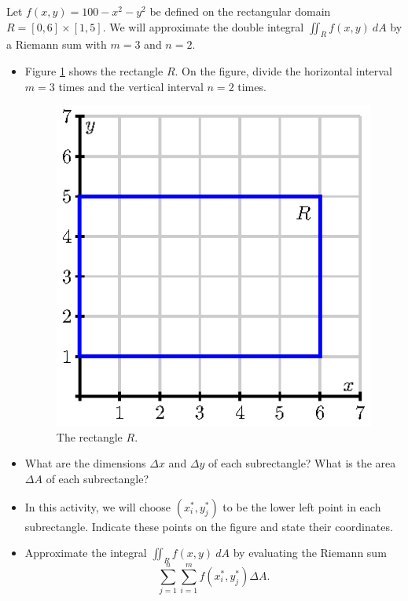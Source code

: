 \begin{activity} \label{A:11.1.10} 
  \ba
  \item Let $f(x,y) = 100 - x^2-y^2$ be
  defined on the rectangular domain $R = [0,6] \times
  [1,5]$. We will approximate the double integral
  $\iint_Rf(x,y)~dA$ by a Riemann sum with $m=3$ and $n=2$.

  \begin{itemize}
  \item Figure \ref{F:11.1.activity.rectangle} shows the rectangle
    $R$.  On the figure, divide the horizontal interval $m=3$ times
    and the vertical interval $n=2$ times.

    \begin{figure}[ht]
      \begin{center}
        \includegraphics{figures/fig_11_1_activity_rectangle}
      \end{center}
      \caption{The rectangle $R$.}
      \label{F:11.1.activity.rectangle}
    \end{figure}
  \item What are the dimensions $\Delta x$ and $\Delta y$ of each
    subrectangle?  What is the area $\Delta A$ of each subrectangle? 
  \item In this activity, we will choose $(x_i^*, y_j^*)$ to be the
    lower left point in each subrectangle.  Indicate these points on
    the figure and state their coordinates.
  \item Approximate the integral $\iint_Rf(x,y)~dA$ by
    evaluating the Riemann sum
    $$
    \sum_{j=1}^n\sum_{i=1}^m f(x_i^*, y_j^*)\Delta A.
    $$
  \end{itemize}


\end{activity}
